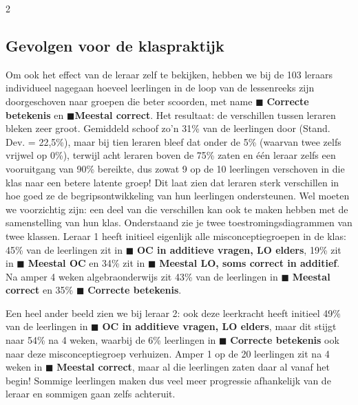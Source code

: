 \begin{multicols}{2}
\subsection{Gevolgen voor de klaspraktijk}
Om ook het effect van de leraar zelf te bekijken, hebben we bij de 103 leraars individueel nagegaan hoeveel leerlingen in de loop van de lessenreeks zijn doorgeschoven naar groepen die beter scoorden, met name \textcolor{kleurcorrectbetekenis}{$\blacksquare$} \textbf{Correcte betekenis} en \textcolor{kleurmeestalcorrect}{$\blacksquare$}{\textbf{Meestal correct}}. Het resultaat: de verschillen tussen leraren bleken zeer groot. Gemiddeld schoof zo’n 31\% van de leerlingen door (Stand. Dev. = 22,5\%), maar bij tien leraren bleef dat onder de 5\% (waarvan twee zelfs vrijwel op 0\%), terwijl acht leraren boven de 75\% zaten en één leraar zelfs een vooruitgang van 90\% bereikte, dus zowat 9 op de 10 leerlingen verschoven in die klas naar een betere latente groep! Dit laat zien dat leraren sterk verschillen in hoe goed ze de begripsontwikkeling van hun leerlingen ondersteunen. Wel moeten we voorzichtig zijn: een deel van die verschillen kan ook te maken hebben met de samenstelling van hun klas. Onderstaand zie je twee toestromingsdiagrammen van twee klassen. 
Leraar 1 heeft initieel eigenlijk alle misconceptiegroepen in de klas: 45\%  van de leerlingen zit in \textcolor{kleurOCaddLOelders}{$\blacksquare$} \textbf{OC in additieve vragen, LO elders}, 19\% zit in \textcolor{kleurmeestalOC}{$\blacksquare$} \textbf{Meestal OC} en 34\% zit in \textcolor{kleurmeestalLO}{$\blacksquare$} \textbf{Meestal LO, soms correct in additief}. Na amper 4 weken algebraonderwijs zit 43\% van de leerlingen in \textcolor{kleurmeestalcorrect}{$\blacksquare$}{ \textbf{Meestal correct}} en 35\% \textcolor{kleurcorrectbetekenis}{$\blacksquare$} \textbf{Correcte betekenis}.

Een heel ander beeld zien we bij leraar 2: ook deze leerkracht heeft initieel 49\% van de leerlingen in \textcolor{kleurOCaddLOelders}{$\blacksquare$} \textbf{OC in additieve vragen, LO elders}, maar dit stijgt naar 54\% na 4 weken, waarbij de 6\% leerlingen in \textcolor{kleurcorrectbetekenis}{$\blacksquare$} \textbf{Correcte betekenis} ook naar deze misconceptiegroep verhuizen. Amper 1 op de 20 leerlingen zit na 4 weken in \textcolor{kleurmeestalcorrect}{$\blacksquare$}{ \textbf{Meestal correct}}, maar al die leerlingen zaten daar al vanaf het begin! Sommige leerlingen maken dus veel meer progressie afhankelijk van de leraar en sommigen gaan zelfs achteruit.


\end{multicols}
